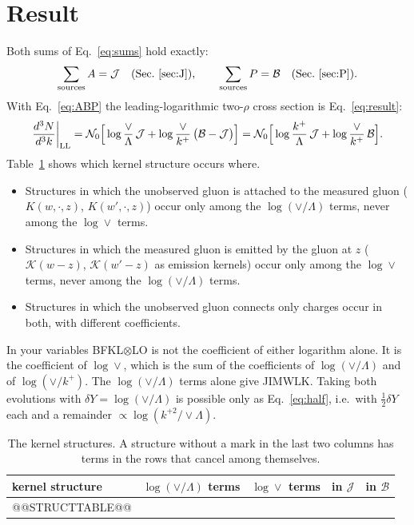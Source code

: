 \documentclass[10pt]{article}
\numberwithin{equation}{section}
\newcommand{\KK}{\mathcal K}
\newcommand{\NO}{\mathcal N_0}
\newcommand{\J}{\mathcal J}
\newcommand{\B}{\mathcal B}
\begin{document}
\section{Result}\label{sec:result}
Both sums of Eq.~\eqref{eq:sums} hold exactly:
\begin{equation}
\sum_{\rm sources}A=\J\quad(\text{Sec.~\ref{sec:J}}),\qquad\sum_{\rm sources}P=\B\quad(\text{Sec.~\ref{sec:P}}).
\end{equation}
With Eq.~\eqref{eq:ABP} the leading-logarithmic two-$\rho$ cross section is Eq.~\eqref{eq:result}:
\begin{equation}
\frac{d^3N}{d^3k}\bigg|_{\rm LL}=\NO\Big[\log\frac{\vee}{\Lambda}\,\J+\log\frac{\vee}{k^+}\,\big(\B-\J\big)\Big]=\NO\Big[\log\frac{k^+}{\Lambda}\,\J+\log\frac{\vee}{k^+}\,\B\Big].
\end{equation}
Table~\ref{tab:structures} shows which kernel structure occurs where.
\begin{itemize}
\item Structures in which the unobserved gluon is attached to the measured gluon ($K(w,\cdot,z)$, $K(w',\cdot,z)$) occur only among the $\log(\vee/\Lambda)$ terms, never among the $\log\vee$ terms.
\item Structures in which the measured gluon is emitted by the gluon at $z$ ($\KK(w-z)$, $\KK(w'-z)$ as emission kernels) occur only among the $\log\vee$ terms, never among the $\log(\vee/\Lambda)$ terms.
\item Structures in which the unobserved gluon connects only charges occur in both, with different coefficients.
\end{itemize}
In your variables BFKL$\otimes$LO is not the coefficient of either logarithm alone. It is the coefficient of $\log\vee$, which is the sum of the coefficients of $\log(\vee/\Lambda)$ and of $\log(\vee/k^+)$. The $\log(\vee/\Lambda)$ terms alone give JIMWLK. Taking both evolutions with $\delta Y=\log(\vee/\Lambda)$ is possible only as Eq.~\eqref{eq:half}, i.e.\ with $\frac12\delta Y$ each and a remainder $\propto\log(k^{+2}/\vee\Lambda)$.

\begin{table}[H]
\centering\small
\begin{tabular}{@{}l c c c c@{}}
kernel structure & $\log(\vee/\Lambda)$ terms & $\log\vee$ terms & in $\J$ & in $\B$\\ \hline
@@STRUCTTABLE@@
\end{tabular}
\caption{The kernel structures. A structure without a mark in the last two columns has terms in the rows that cancel among themselves.}
\label{tab:structures}
\end{table}
\end{document}

